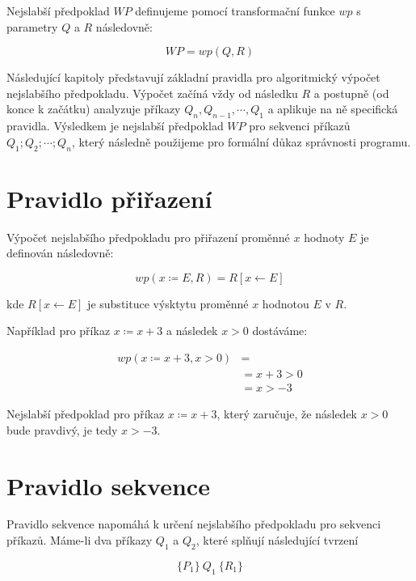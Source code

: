 Nejslabší předpoklad $WP$ definujeme pomocí transformační funkce $wp$
s parametry $Q$ a $R$ následovně:

\begin{equation*}
    WP = wp(Q, R)
\end{equation*}

Následující kapitoly představují základní pravidla pro algoritmický výpočet nejslabšího předpokladu.
Výpočet začíná vždy od následku $R$ a postupně (od konce k začátku)
analyzuje příkazy $Q_n, Q_{n-1}, \cdots, Q_1$ a aplikuje na ně specifická pravidla.
Výsledkem je nejslabší předpoklad $WP$ pro sekvenci příkazů $Q_1; Q_2; \cdots; Q_n$,
který následně použijeme pro formální důkaz správnosti programu.

\section{Pravidlo přiřazení}
\label{sec:pravidlo-prirazeni}

Výpočet nejslabšího předpokladu pro přiřazení proměnné $x$ hodnoty $E$ je
definován následovně:

\begin{equation*}
    wp(x \coloneqq E, R) = R[x \leftarrow E]
\end{equation*}

kde $R[x \leftarrow E]$ je substituce výsktytu proměnné $x$ hodnotou $E$ v $R$.

Například pro příkaz $x \coloneqq x + 3$ a následek $x > 0$ dostáváme:

\begin{align*}
    wp(x \coloneqq x + 3, x > 0) & = \\
                                 & = x + 3 > 0 \\
                                 & = x > -3
\end{align*}

Nejslabší předpoklad pro příkaz $x \coloneqq x + 3$, který zaručuje, že
následek $x > 0$ bude pravdivý, je tedy $x > -3$.

\section{Pravidlo sekvence}
\label{sec:pravidlo-sekvence}

Pravidlo sekvence napomáhá k určení nejslabšího předpokladu pro sekvenci příkazů.
Máme-li dva příkazy $Q_1$ a $Q_2$, které splňují následující tvrzení

\begin{equation*}
    \{ P_1 \} \  Q_1 \  \{ R_1 \}
\end{equation*}

